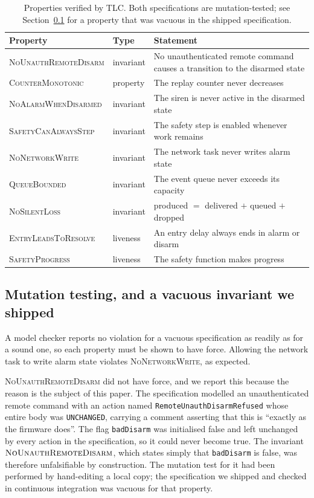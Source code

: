 \begin{table}[htbp]
\centering\small
\caption{Properties verified by TLC. Both specifications are mutation-tested; see
Section~\ref{sec:vacuity} for a property that was vacuous in the shipped specification.}
\label{tab:properties}
\begin{tabular}{@{}llp{}@{}}
\toprule
Property & Type & Statement \\
\midrule
\textsc{NoUnauthRemoteDisarm} & invariant & No unauthenticated remote command causes a transition to the disarmed state \\
\textsc{CounterMonotonic}     & property  & The replay counter never decreases \\
\textsc{NoAlarmWhenDisarmed}  & invariant & The siren is never active in the disarmed state \\
\textsc{SafetyCanAlwaysStep}  & invariant & The safety step is enabled whenever work remains \\
\textsc{NoNetworkWrite}       & invariant & The network task never writes alarm state \\
\textsc{QueueBounded}         & invariant & The event queue never exceeds its capacity \\
\textsc{NoSilentLoss}         & invariant & produced $=$ delivered $+$ queued $+$ dropped \\
\textsc{EntryLeadsToResolve}  & liveness  & An entry delay always ends in alarm or disarm \\
\textsc{SafetyProgress}       & liveness  & The safety function makes progress \\
\bottomrule
\end{tabular}
\end{table}

\subsection{Mutation testing, and a vacuous invariant we shipped}\label{sec:vacuity}

A model checker reports no violation for a vacuous specification as readily as for a sound one,
so each property must be shown to have force. Allowing the network task to write alarm state
violates \textsc{NoNetworkWrite}, as expected.

\textsc{NoUnauthRemoteDisarm} did not have force, and we report this because the reason is the
subject of this paper. The specification modelled an unauthenticated remote command with an
action named \texttt{RemoteUnauthDisarmRefused} whose entire body was
\texttt{UNCHANGED}, carrying a comment asserting that this is ``exactly as the firmware does''.
The flag \texttt{badDisarm} was initialised false and left unchanged by every action in the
specification, so it could never become true. The invariant
$\textsc{NoUnauthRemoteDisarm}$, which states simply that \texttt{badDisarm} is false, was
therefore unfalsifiable by construction. The mutation test for it had been performed by hand-editing a local copy; the
specification we shipped and checked in continuous integration was vacuous for that property.


